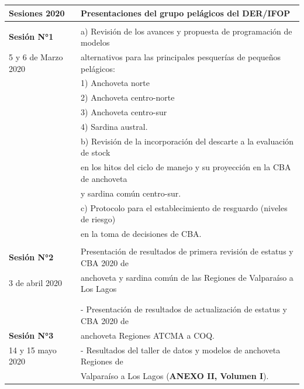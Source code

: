 \documentclass[
  spanish,
]{article}
\begin{document}
\begin{table}[h]
  \centering
  \resizebox{16cm}{!} {
  \begin{tabular}{|l|l|}
  \hline
  Sesiones 2020           & Presentaciones del grupo pelágicos del DER/IFOP \\ \hline
                          & \\
  \textbf{Sesión N°1}     & a)  Revisión de los avances y propuesta de programación de modelos  \\
  5 y 6 de Marzo 2020     & alternativos para las principales pesquerías de pequeños pelágicos: \\
                          &   1)    Anchoveta norte \\
                          &   2)    Anchoveta centro-norte \\
                          &   3)    Anchoveta centro-sur \\
                          &   4)    Sardina austral. \\
                          & b)  Revisión de la incorporación del descarte a la evaluación de stock \\
                          & en los hitos del ciclo de manejo y su proyección en la CBA de anchoveta \\
                          & y sardina común centro-sur. \\
                          & c)  Protocolo para el establecimiento de resguardo (niveles de riesgo) \\
                          & en la toma de decisiones de CBA. \\ \hline
                          & \\
  \textbf{Sesión N°2}     & Presentación de resultados de primera revisión de estatus y CBA 2020 de \\
  3 de abril 2020         & anchoveta y sardina común de las Regiones de Valparaíso a Los Lagos \\ 
                          & \\ \hline
                          & \\
                          & -   Presentación de resultados de actualización de estatus y CBA 2020 de \\
  \textbf{Sesión N°3}     & anchoveta Regiones ATCMA a COQ. \\
  14 y 15 mayo 2020       & -   Resultados del taller de datos y modelos de anchoveta Regiones de \\
                          & Valparaíso a Los Lagos (\textbf{ANEXO II, Volumen I}). \\ \hline

\end{tabular}}
\end{table}
\end{document}
